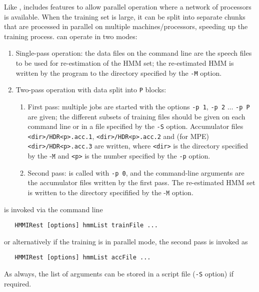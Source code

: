 Like ,  includes features to allow parallel
operation where a network of processors is available. When the training set
is large, it can be split into separate chunks that are processed in
parallel on multiple machines/processors, speeding up the training process.
 can operate in two modes:
\begin{enumerate}
\item Single-pass operation: the data files on the command line are the
  speech files to be used for re-estimation of the HMM set; the re-estimated
  HMM is written by the program to the directory specified by the {\texttt{-M}}
   option.
\item Two-pass operation with data split into \texttt{P} blocks:
   \begin{enumerate}  
     \item First pass: multiple jobs are started with the options \texttt{-p 1}, 
       \texttt{-p 2} $\ldots$ \texttt{-p P} are given; the different subsets of training
     files should be given on each command line or in a file specified by the \texttt{-S}
     option.  Accumulator files \texttt{<dir>/HDR<p>.acc.1},  \texttt{<dir>/HDR<p>.acc.2} 
    and (for MPE) \texttt{<dir>/HDR<p>.acc.3}  are written, where \texttt{<dir>} is
    the directory specified by the $\texttt{-M}$  and \texttt{<p>} is the number specified
     by the \texttt{-p} option.  
     \item Second pass:  is called with \texttt{-p 0}, and the
      command-line arguments are the accumulator files written by the first pass.
     The re-estimated HMM set is written to the directory specifified by the $\texttt{-M}$ option. 
   \end{enumerate}
\end{enumerate}



 \label{sec:hmmirestuse}

 is invoked via the command line
\begin{verbatim}
   HMMIRest [options] hmmList trainFile ...
\end{verbatim}
or alternatively if the training is in parallel mode, the second pass is invoked as
\begin{verbatim}
   HMMIRest [options] hmmList accFile ...
\end{verbatim}

As always, the list of arguments can be stored in a script file (\texttt{-S} option) if required.  

